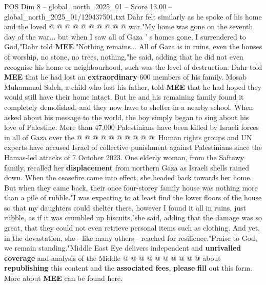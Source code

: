 \begin{textsample}{POS Dim 8 – global\_north\_2025\_01 – Score 13.00 – global\_north\_2025\_01/120437501.txt}
Dahr felt similarly as he spoke of his home and the loved @ @ @ @ @ @ @ @ @ @ war."My home was gone on the seventh day of the war... but when I saw all of Gaza ' s homes gone, I surrendered to God,"Dahr told \textbf{MEE}."Nothing remains...
All of Gaza is in ruins, even the houses of worship, no stone, no trees, nothing,"he said, adding that he did not even recognise his home or neighbourhood, such was the level of destruction.
Dahr told \textbf{MEE} that he had lost an \textbf{extraordinary} 600 members of his family.
Mosab Muhammad Saleh, a child who lost his father, told \textbf{MEE} that he had hoped they would still have their home intact.
But he and his remaining family found it completely demolished, and they now have to shelter in a nearby school.
When asked about his message to the world, the boy simply began to sing about his love of Palestine.
More than 47,000 Palestinians have been killed by Israeli forces in all of Gaza over the @ @ @ @ @ @ @ @ @ @.
Human rights groups and UN experts have accused Israel of collective punishment against Palestinians since the Hamas-led attacks of 7 October 2023.
One elderly woman, from the Saftawy family, recalled her \textbf{displacement} from northern Gaza as Israeli shells rained down.
When the ceasefire came into effect, she headed back towards her home.
But when they came back, their once four-storey family house was nothing more than a pile of rubble."I was expecting to at least find the lower floors of the house so that my daughters could shelter there, however I found it all in ruins, just rubble, as if it was crumbled up biscuits,"she said, adding that the damage was so great, that they could not even retrieve personal items such as clothing.
And yet, in the devastation, she - like many others - reached for resilience."Praise to God, we remain standing."Middle East Eye delivers independent and \textbf{unrivalled} \textbf{coverage} and analysis of the Middle @ @ @ @ @ @ @ @ @ @ about \textbf{republishing} this content and the \textbf{associated} \textbf{fees}, \textbf{please} \textbf{fill} out this form.
More about \textbf{MEE} can be found here.

\end{textsample}
